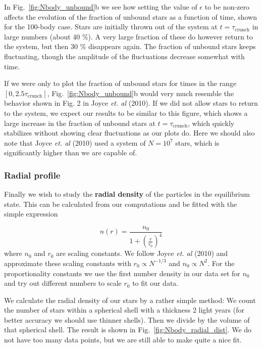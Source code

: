 \documentclass{article}
\begin{document}
\begin{multicols}{2}

In Fig.~\ref{fig:Nbody_unbound}b we see how setting the value of $\epsilon$ to be non-zero affects the evolution of the fraction of unbound stars as a function of time, shown for the 100-body case. Stars are initially thrown out of the system at $t = \tau_{\mathrm{crunch}}$ in large numbers (about 40 \%). A very large fraction of these do however return to the system, but then 30 \% disappears again. The fraction of unbound stars keeps fluctuating, though the amplitude of the fluctuations decrease somewhat with time.

If we were only to plot the fraction of unbound stars for times in the range $[0,2.5\tau_{\mathrm{crunch}}]$, Fig.~\ref{fig:Nbody_unbound}b would very much resemble the behavior shown in Fig. 2 in Joyce \textit{et. al} (2010). If we did not allow stars to return to the system, we expect our results to be similar to this figure, which shows a large increase in the fraction of unbound stars at $t = \tau_{\mathrm{crunch}}$, which quickly stabilizes without showing clear fluctuations as our plots do. Here we should also note that Joyce \textit{et. al} (2010) used a system of $N = 10^7$ stars, which is significantly higher than we are capable of.



\subsubsection{Radial profile}

Finally we wish to study the \textbf{radial density} of the particles in the equilibrium state. This can be calculated from our computations and be fitted with the simple expression

\begin{equation}\label{eq:simple_fit}
	n(r) = \frac{n_0}{1 + (\frac{r}{r_0})^4}
\end{equation}
where $n_0$ and $r_0$ are scaling constants. We follow Joyce \textit{et. al} (2010) and approximate these scaling constants with $r_0 \propto N^{-1/3}$ and $n_0 \propto N^2$. For the proportionality constants we use the first number density in our data set for $n_0$ and try out different numbers to scale $r_0$ to fit our data.

We calculate the radial density of our stars by a rather simple method: We count the number of stars within a spherical shell with a thickness 2 light years (for better accuracy we should use thinner shells). Then we divide by the volume of that spherical shell. The result is shown in Fig.~\ref{fig:Nbody_radial_dist}. We do not have too many data points, but we are still able to make quite a nice fit.


\end{multicols}
\end{document}
